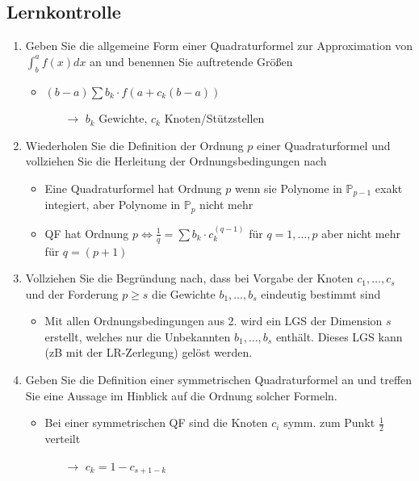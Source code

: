 \documentclass[]{article}
\newcommand*{\poly}{\ensuremath{\mathbb{P}}}
\begin{document}
\subsection{Lernkontrolle}
	\begin{enumerate}
		\item Geben Sie die allgemeine Form einer Quadraturformel zur Approximation von $\int_b^a f(x) dx$ an und benennen Sie auftretende Größen
			\begin{itemize}
				\item $(b-a) \sum b_k \cdot f(a + c_k(b-a))$
					\begin{itemize}
						\item[$\rightarrow$] $b_k$ Gewichte, $c_k$ Knoten/Stützstellen
					\end{itemize}	
			\end{itemize}
		\item Wiederholen Sie die Definition der Ordnung $p$ einer Quadraturformel und vollziehen Sie die Herleitung der Ordnungsbedingungen nach
			\begin{itemize}
				\item Eine Quadraturformel hat Ordnung $p$ wenn sie Polynome in $\poly_{p-1}$ exakt integiert, aber Polynome in $\poly_p$ nicht mehr
				\item QF hat Ordnung $p \Leftrightarrow \frac{1}{q} = \sum b_k \cdot c_k^{(q-1)}$ für $q = 1, \dots , p$ aber nicht mehr für $q = (p+1)$
			\end{itemize}
		\item Vollziehen Sie die Begründung nach, dass bei Vorgabe der Knoten $c_1, \dots , c_s$ und der Forderung $p \geq s$ die Gewichte $b_1, \dots , b_s$ eindeutig bestimmt sind
			\begin{itemize}
				\item Mit allen Ordnungsbedingungen aus 2. wird ein LGS der Dimension $s$ erstellt, welches nur die Unbekannten $b_1, \dots , b_s$ enthält. Dieses LGS kann (zB mit der LR-Zerlegung) gelöst werden.
			\end{itemize}
		\item Geben Sie die Definition einer symmetrischen Quadraturformel an und treffen Sie eine Aussage im Hinblick auf die Ordnung solcher Formeln.
			\begin{itemize}
				\item Bei einer symmetrischen QF sind die Knoten $c_i$ symm. zum Punkt $\frac{1}{2}$ verteilt
					\begin{itemize}
						\item[$\rightarrow$] $c_k = 1 - c_{s+1-k}$

\end{itemize}
\end{itemize}
\end{enumerate}
\end{document}
